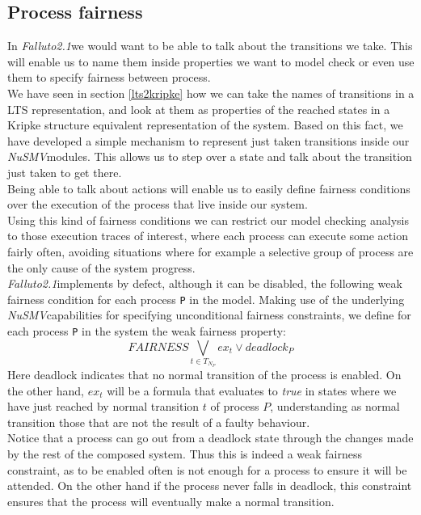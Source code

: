 \documentclass[12pt]{article}
\newcommand{\nusmv}{\mbox{\textit{NuSMV}}}
\newcommand{\falluto}{\mbox{\textit{Falluto2.1}}}
\begin{document}
\subsection{Process fairness}\label{process fairness}
In \falluto we would want to be able to talk about the transitions we take. This will enable us to name them inside properties we want to model check or even use them to specify fairness between process.\\
We have seen in section \ref{lts2kripke} how we can take the names of transitions in a LTS representation, and look at them as properties of the reached states in a Kripke structure equivalent representation of the system. Based on this fact, we have developed a simple mechanism to represent just taken transitions inside our \nusmv modules. This allows us to step over a state and talk about the transition just taken to get there.\\
Being able to talk about actions will enable us to easily define fairness
conditions over the execution of the process that live inside our system.\\
Using this kind of fairness conditions we can restrict our model
checking analysis to those execution traces of interest, where each process
can execute some action fairly often, avoiding situations where for example a
selective group of process are the only cause of the system progress.\\        %
\falluto implements by defect, although it can be disabled, the following weak fairness
condition for each process \texttt{P} in the model. Making use of the
underlying \nusmv capabilities for specifying unconditional
fairness constraints, we define for each process \texttt{P} in the system the
weak fairness property:
$$FAIRNESS \bigvee_{t \in T_{N_{P}}} ex_t \vee deadlock_P$$
Here deadlock indicates that no normal transition of the process is enabled. On the other hand, $ex_t$ will be a formula that evaluates to \textit{true} in states where we have just reached by normal transition $t$ of process $P$, understanding as normal transition those that are not the result of a faulty behaviour.\\
Notice that a process can go out from a deadlock state through the
changes made by the rest of the composed system. Thus this is
indeed a weak fairness constraint, as to be enabled often is not enough for a
process to ensure it will be attended. On the other hand if the process never
falls in deadlock, this constraint ensures that the process will eventually
make a normal transition.
\end{document}
